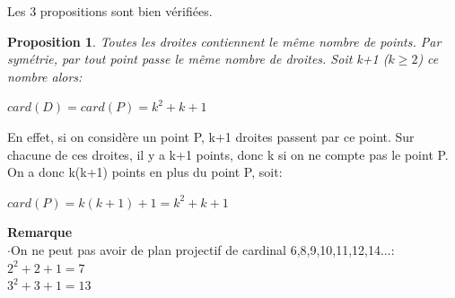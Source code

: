 \documentclass[a4paper]{article}
\newtheorem{Prop}[Def]{Proposition}
\begin{document}
\vspace{2\baselineskip}
Les 3 propositions sont bien vérifiées.
\vspace{2\baselineskip}
\begin{Prop}
Toutes les droites contiennent le même nombre de points. Par symétrie, par tout point passe le même nombre de droites. Soit k+1 ($k\geq2$) ce nombre alors:
\begin{center}
$card(D)=card(P)=k^2+k+1$
\end{center}
\end{Prop}

\vspace{2\baselineskip}

En effet, si on considère un point P, k+1 droites passent par ce point. Sur chacune de ces droites, il y a k+1 points, donc k si on ne compte pas le point P. On a donc k(k+1) points en plus du point P, soit:
\begin{center}
$card(P)=k(k+1)+1=k^2+k+1$
\end{center}
\vspace{1\baselineskip}
\textbf{Remarque}\\
$\cdot$On ne peut pas avoir de plan projectif de cardinal 6,8,9,10,11,12,14...: \\
$2^2+2+1=7$ \\
  $3^2+3+1=13$\\
\end{document}
